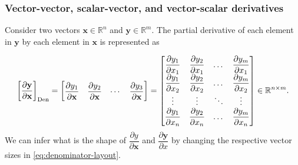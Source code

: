 \documentclass{article}
\begin{document}
\subsubsection{Vector-vector, scalar-vector, and vector-scalar derivatives}
Consider two vectors \(\mathbf{x} \in \mathbb{R}^n\) and \(\mathbf{y} \in \mathbb{R}^m\). The partial derivative of each element in \(\mathbf{y}\) by each element in \(\mathbf{x}\) is represented as

\begin{align}
    \label{eq:denominator-layout}
    \left[ \dfrac{\partial \mathbf{y}}{\partial \mathbf{x}} \right]_{\textnormal{Den}} = \begin{bmatrix}
        \dfrac{\partial y_1}{\partial \mathbf{x}} & \dfrac{\partial y_2}{\partial \mathbf{x}} & \cdots & \dfrac{\partial y_3}{\partial \mathbf{x}}
    \end{bmatrix} = \begin{bmatrix}
        \dfrac{\partial y_1}{\partial x_1} & \dfrac{\partial y_2}{\partial x_1} & \dots & \dfrac{\partial y_m}{\partial x_1} \\
        \dfrac{\partial y_1}{\partial x_2} & \dfrac{\partial y_2}{\partial x_2} & \dots & \dfrac{\partial y_m}{\partial x_2} \\
        \vdots & \vdots & \ddots & \vdots \\
        \dfrac{\partial y_1}{\partial x_n} & \dfrac{\partial y_2}{\partial x_n} & \dots & \dfrac{\partial y_m}{\partial x_n} \\
    \end{bmatrix} \in \mathbb{R}^{n\times m}.
\end{align}
We can infer what is the shape of \(\dfrac{\partial y}{\partial \mathbf{x}}\) and \(\dfrac{\partial \mathbf{y}}{\partial x}\) by changing the respective vector sizes in \eqref{eq:denominator-layout}.
\end{document}
